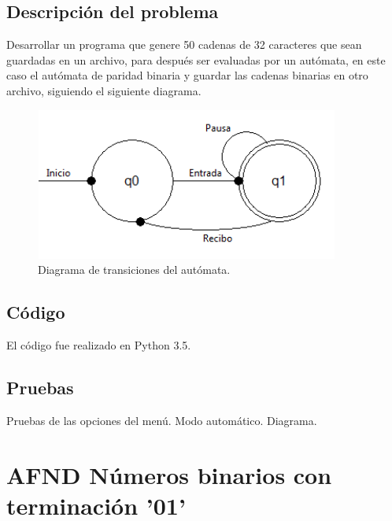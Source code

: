 \documentclass[12pt, titlepage]{article}
\begin{document}
	\subsection{Descripción del problema}
	Desarrollar un programa que genere 50 cadenas de 32 caracteres que sean guardadas en un archivo, para después ser evaluadas por un autómata, en este caso el autómata de paridad binaria y guardar las cadenas binarias en otro archivo, siguiendo el siguiente diagrama.
	\begin{figure}[ht]
		\begin{center}
			\includegraphics[width=10cm, height=5cm]{img/protocolo.png}
			\caption{Diagrama de transiciones del autómata. \cite{WEB}}
			\label{fig:diagrama3}
		\end{center}
	\end{figure}
	\subsection{Código}
	El código fue realizado en Python 3.5.
	\subsection{Pruebas}
	Pruebas de las opciones del menú.
	{\large Modo automático.}
	{\large Diagrama.}
	
	\section{AFND Números binarios con terminación '01'}
\end{document}
